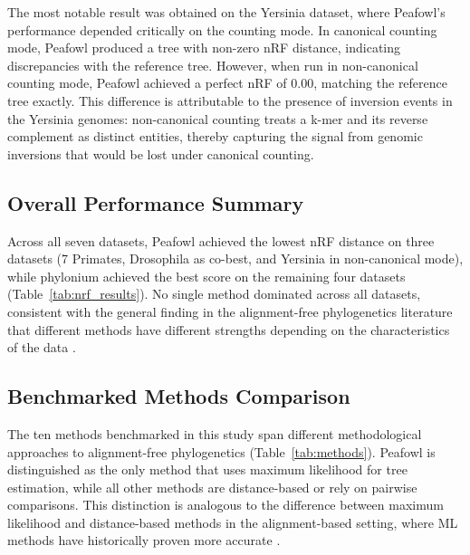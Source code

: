 \documentclass[12pt]{article}
\begin{document}
The most notable result was obtained on the Yersinia dataset, where Peafowl's performance depended critically on the counting mode. In canonical counting mode, Peafowl produced a tree with non-zero nRF distance, indicating discrepancies with the reference tree. However, when run in non-canonical counting mode, Peafowl achieved a perfect nRF of 0.00, matching the reference tree exactly. This difference is attributable to the presence of inversion events in the Yersinia genomes: non-canonical counting treats a k-mer and its reverse complement as distinct entities, thereby capturing the signal from genomic inversions that would be lost under canonical counting.

\subsection{Overall Performance Summary}

Across all seven datasets, Peafowl achieved the lowest nRF distance on three datasets (7 Primates, Drosophila as co-best, and Yersinia in non-canonical mode), while phylonium achieved the best score on the remaining four datasets (Table~\ref{tab:nrf_results}). No single method dominated across all datasets, consistent with the general finding in the alignment-free phylogenetics literature that different methods have different strengths depending on the characteristics of the data \citep{zielezinski2017}.

\subsection{Benchmarked Methods Comparison}

The ten methods benchmarked in this study span different methodological approaches to alignment-free phylogenetics (Table~\ref{tab:methods}). Peafowl is distinguished as the only method that uses maximum likelihood for tree estimation, while all other methods are distance-based or rely on pairwise comparisons. This distinction is analogous to the difference between maximum likelihood and distance-based methods in the alignment-based setting, where ML methods have historically proven more accurate \citep{huelsenbeck1995}.
\end{document}
